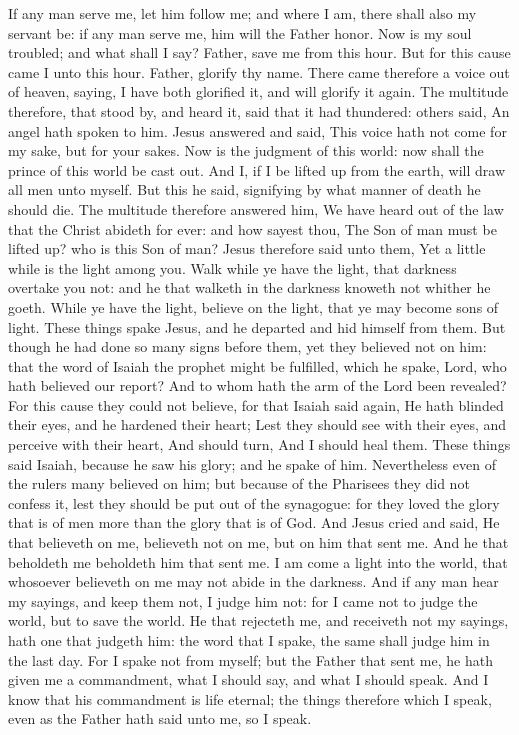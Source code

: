 If any man serve me, let him follow me; and where I am, there shall also my servant be: if any man serve me, him will the Father honor. Now is my soul troubled; and what shall I say? Father, save me from this hour. But for this cause came I unto this hour. Father, glorify thy name. There came therefore a voice out of heaven, saying, I have both glorified it, and will glorify it again. The multitude therefore, that stood by, and heard it, said that it had thundered: others said, An angel hath spoken to him. Jesus answered and said, This voice hath not come for my sake, but for your sakes. Now is the judgment of this world: now shall the prince of this world be cast out. And I, if I be lifted up from the earth, will draw all men unto myself. But this he said, signifying by what manner of death he should die. The multitude therefore answered him, We have heard out of the law that the Christ abideth for ever: and how sayest thou, The Son of man must be lifted up? who is this Son of man? Jesus therefore said unto them, Yet a little while is the light among you. Walk while ye have the light, that darkness overtake you not: and he that walketh in the darkness knoweth not whither he goeth. While ye have the light, believe on the light, that ye may become sons of light. These things spake Jesus, and he departed and hid himself from them. But though he had done so many signs before them, yet they believed not on him: that the word of Isaiah the prophet might be fulfilled, which he spake, Lord, who hath believed our report? And to whom hath the arm of the Lord been revealed?  For this cause they could not believe, for that Isaiah said again,  He hath blinded their eyes, and he hardened their heart; Lest they should see with their eyes, and perceive with their heart, And should turn, And I should heal them.  These things said Isaiah, because he saw his glory; and he spake of him. Nevertheless even of the rulers many believed on him; but because of the Pharisees they did not confess it, lest they should be put out of the synagogue: for they loved the glory that is of men more than the glory that is of God.  And Jesus cried and said, He that believeth on me, believeth not on me, but on him that sent me. And he that beholdeth me beholdeth him that sent me. I am come a light into the world, that whosoever believeth on me may not abide in the darkness. And if any man hear my sayings, and keep them not, I judge him not: for I came not to judge the world, but to save the world. He that rejecteth me, and receiveth not my sayings, hath one that judgeth him: the word that I spake, the same shall judge him in the last day. For I spake not from myself; but the Father that sent me, he hath given me a commandment, what I should say, and what I should speak. And I know that his commandment is life eternal; the things therefore which I speak, even as the Father hath said unto me, so I speak. 


